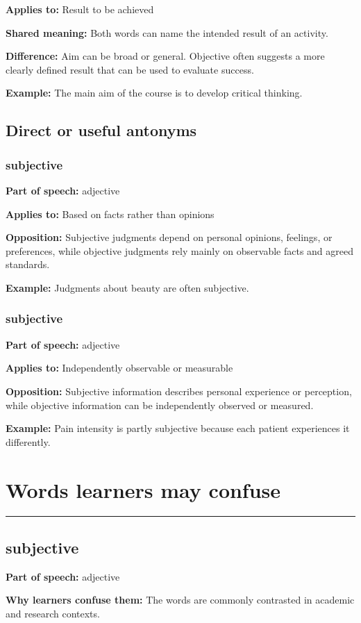 \documentclass[11pt]{article}
\newcommand{\sectionrule}{\par\vspace{-0.5em}\noindent\textcolor{Accent}{\rule{\linewidth}{0.6pt}}\par}
\begin{document}
\textbf{Applies to:} Result to be achieved

\textbf{Shared meaning:} Both words can name the intended result of an activity.

\textbf{Difference:} Aim can be broad or general. Objective often suggests a more clearly defined result that can be used to evaluate success.

\textbf{Example:} The main aim of the course is to develop critical thinking.

\subsection{Direct or useful antonyms}
\subsubsection{subjective}
\textbf{Part of speech:} adjective

\textbf{Applies to:} Based on facts rather than opinions

\textbf{Opposition:} Subjective judgments depend on personal opinions, feelings, or preferences, while objective judgments rely mainly on observable facts and agreed standards.

\textbf{Example:} Judgments about beauty are often subjective.

\subsubsection{subjective}
\textbf{Part of speech:} adjective

\textbf{Applies to:} Independently observable or measurable

\textbf{Opposition:} Subjective information describes personal experience or perception, while objective information can be independently observed or measured.

\textbf{Example:} Pain intensity is partly subjective because each patient experiences it differently.

\section{Words learners may confuse}
\sectionrule
\subsection{subjective}
\textbf{Part of speech:} adjective

\textbf{Why learners confuse them:} The words are commonly contrasted in academic and research contexts.
\end{document}
